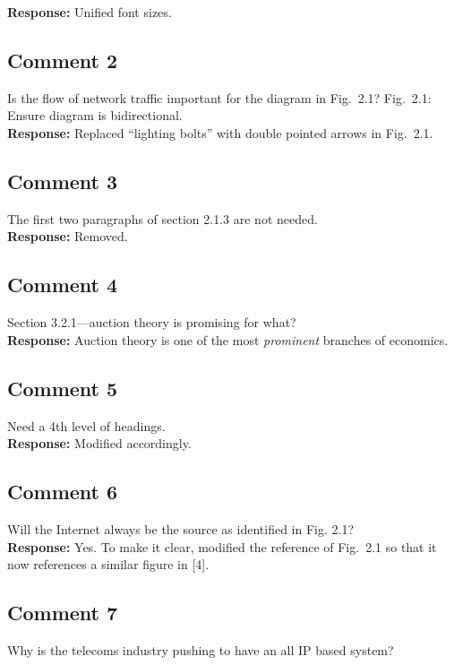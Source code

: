 \documentclass[10pt,a4paper,notitlepage]{article}
\numberwithin{equation}{section}
\begin{document}
\textbf{Response:}
Unified font sizes.

\subsection{Comment 2}
Is the flow of network traffic important for the diagram in Fig.~2.1? Fig.~2.1: Ensure diagram is bidirectional.\\[-2ex]

\textbf{Response:}
Replaced ``lighting bolts'' with double pointed arrows in Fig.~2.1.

\subsection{Comment 3}
The first two paragraphs of section 2.1.3 are not needed.\\[-2ex]

\textbf{Response:}
Removed.

\subsection{Comment 4}
Section 3.2.1---auction theory is promising for what?\\[-2ex]

\textbf{Response:}
Auction theory is one of the most \emph{prominent} branches of economics.

\subsection{Comment 5}
Need a 4th level of headings.\\[-2ex]

\textbf{Response:}
Modified accordingly.

\subsection{Comment 6}
Will the Internet always be the source as identified in Fig. 2.1?\\[-2ex]

\textbf{Response:}
Yes. To make it clear, modified the reference of Fig.~2.1 so that it now references a similar figure in [4].

\subsection{Comment 7}
Why is the telecoms industry pushing to have an all IP based system?\\[-2ex]
\end{document}
